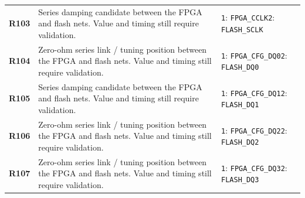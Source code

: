 \documentclass[11pt,a4paper]{article}
\begin{document}
\begin{longtable}{@{}P{27mm}P{84mm}P{57mm}@{}}
\textbf{R103} & Series damping candidate between the FPGA and flash nets. Value and timing still require validation. & \nolinkurl{1}: \nolinkurl{FPGA_CCLK}\newline \nolinkurl{2}: \nolinkurl{FLASH_SCLK} \\
\textbf{R104} & Zero-ohm series link / tuning position between the FPGA and flash nets. Value and timing still require validation. & \nolinkurl{1}: \nolinkurl{FPGA_CFG_DQ0}\newline \nolinkurl{2}: \nolinkurl{FLASH_DQ0} \\
\textbf{R105} & Series damping candidate between the FPGA and flash nets. Value and timing still require validation. & \nolinkurl{1}: \nolinkurl{FPGA_CFG_DQ1}\newline \nolinkurl{2}: \nolinkurl{FLASH_DQ1} \\
\textbf{R106} & Zero-ohm series link / tuning position between the FPGA and flash nets. Value and timing still require validation. & \nolinkurl{1}: \nolinkurl{FPGA_CFG_DQ2}\newline \nolinkurl{2}: \nolinkurl{FLASH_DQ2} \\
\textbf{R107} & Zero-ohm series link / tuning position between the FPGA and flash nets. Value and timing still require validation. & \nolinkurl{1}: \nolinkurl{FPGA_CFG_DQ3}\newline \nolinkurl{2}: \nolinkurl{FLASH_DQ3} \\

\end{longtable}
\end{document}
